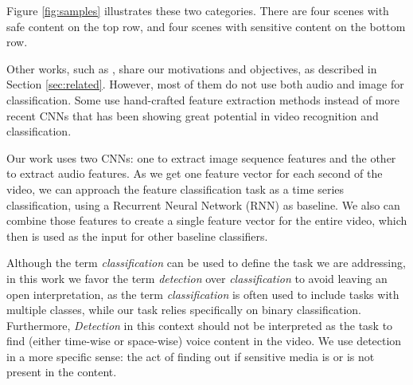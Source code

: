 Figure \ref{fig:samples} illustrates these two categories.
There are four scenes with safe content on the top row, and four scenes with sensitive content on the bottom row.




Other works, such as \cite{moreira2019multimodal}, share our motivations and objectives, as described in Section \ref{sec:related}. However, most of them do not use both audio and image for classification. Some use hand-crafted feature extraction methods instead of more recent CNNs that has been showing great potential in video recognition and classification.

Our work uses two CNNs: one to extract image sequence features and the other to extract audio features.
As we get one feature vector for each second of the video, we can approach the feature classification task as a time series classification, using a Recurrent Neural Network (RNN) as baseline. We also can combine those features to create a single feature vector for the entire video, which then is used as the input for other baseline classifiers.




Although the term \textit{classification} can be used to define the task we are addressing, in this work we favor the term \textit{detection} over \textit{classification} to avoid leaving an open interpretation, as the term \textit{classification} is often used to include tasks with multiple classes, while our task relies specifically on binary classification. Furthermore, \textit{Detection} in this context should not be interpreted as the task to find (either time-wise or space-wise) voice content in the video.
We use detection in a more specific sense: the act of finding out if sensitive media is or is not present in the content. 

